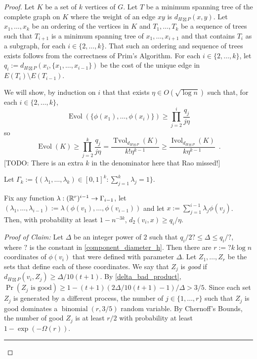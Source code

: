 \documentclass{patmorin}
\renewenvironment{clmproof}{\noindent\emph{Proof of Claim:}}{\hfill\rule{1ex}{1ex}}
\newcommand{\defin}[1]{\emph{\textcolor{brightmaroon}{#1}}}
\DeclareMathOperator{\evol}{Evol}
\DeclareMathOperator{\ivol}{Ivol}
\DeclareMathOperator{\tvol}{Tvol}
\begin{document}
\begin{proof}
  Let $K$ be a set of $k$ vertices of $G$.  Let $T$ be a minimum spanning tree of the complete graph on $K$ where the weight of an edge $xy$ is $d_{H\boxtimes P}(x,y)$.  Let $x_1,\ldots,x_k$ be an ordering of the vertices in $K$ and $T_1,\ldots,T_k$ be a sequence of trees such that $T_{i+1}$ is a minimum spanning tree of $x_1,\ldots,x_{i+1}$ and that contains $T_i$ as a subgraph, for each $i\in\{2,\ldots,k\}$.  That such an ordering and sequence of trees exists follows from the correctness of Prim's Algorithm. For each $i\in\{2,\ldots,k\}$, let $q_i:=d_{H\boxtimes P}(x_i,\{x_1,\ldots,x_{i-1}\})$ be the cost of the unique edge in $E(T_i)\setminus E(T_{i-1})$.

  We will show, by induction on $i$ that that exists $\eta\in O(\sqrt{\log n})$ such that, for each $i\in\{2,\ldots,k\}$,
  \begin{equation}
     \evol(\{\phi(x_1),\ldots,\phi(x_i)\}) \ge \prod_{j=2}^i \frac{q_j}{j\eta}
  \end{equation}
  so
  \[
     \evol(K) \ge \prod_{j=2}^k \frac{q_j}{j\eta}
      = \frac{\tvol_{d_{H\boxtimes P}}(K)}{k!\eta^{k-1}}
      \ge \frac{\ivol_{d_{H\boxtimes P}}(K)}{k\eta^{k-1}} \enspace .
  \]
  [TODO: There is an extra $k$ in the denominator here that Rao missed!]

  Let $\Gamma_k:=\{(\lambda_1,\ldots,\lambda_k)\in [0,1]^k:\sum_{j=1}^k\lambda_j=1\}$.


  \begin{clm}
    Fix any function $\lambda:(\mathbb{R}^{r})^{i-1}\to \Gamma_{i-1}$, let $(\lambda_1,\ldots,\lambda_{i-1}):=\lambda(\phi(v_1),\ldots,\phi(v_{i-1}))$ and let $x:=\sum_{j=1}^{i-1}\lambda_j\phi(v_j)$.
    Then, with probability at least $1-n^{-3k}$, $d_2(v_i,x)\ge q_i/\eta$.
  \end{clm}

  \begin{clmproof}
    Let $\Delta$ be an integer power of $2$ such that $q_i/2? \le\Delta\le q_i/?$, where $?$ is the constant in \cref{component_diameter_h}.  Then there are $r:=?k\log n$ coordinates of $\phi(v_i)$ that were defined with parameter $\Delta$. Let $Z_1,\ldots,Z_{r}$ be the sets that define each of these coordinates.  We say that $Z_j$ is \defin{good} if $d_{H\boxtimes P}(v_i,Z_j)\ge \Delta/10(t+1)$.  By \cref{delta_bad_product},  $\Pr(\text{$Z_j$ is good})\ge 1-(t+1)(2\Delta/10(t+1)-1)/\Delta > 3/5$. Since each set $Z_j$ is generated by a different process, the number of $j\in\{1,\ldots,r\}$ such that $Z_j$ is good dominates a $\operatorname{binomial}(r,3/5)$ random variable. By Chernoff's Bounds, the number of good $Z_j$ is at least $r/2$ with probability at least $1-\exp(-\Omega(r))$.


\end{clmproof}
\end{proof}
\end{document}
